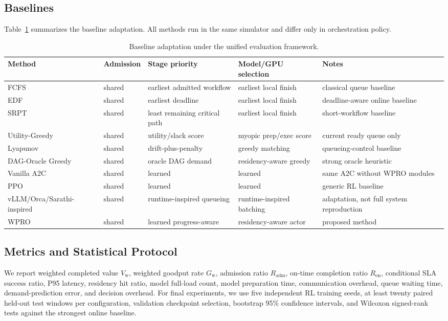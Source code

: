 \documentclass[10pt,conference]{IEEEtran}
\newcommand{\WPRO}{\textsc{WPRO}}
\begin{document}
\subsection{Baselines}

Table~\ref{tab:baselines} summarizes the baseline adaptation. All methods run in the same simulator and differ only in orchestration policy.

\begin{table}[t]
\centering
\caption{Baseline adaptation under the unified evaluation framework.}
\label{tab:baselines}
\begin{tabular}{lllll}
\toprule
Method & Admission & Stage priority & Model/GPU selection & Notes \\
\midrule
FCFS & shared & earliest admitted workflow & earliest local finish & classical queue baseline \\
EDF & shared & earliest deadline & earliest local finish & deadline-aware online baseline \\
SRPT & shared & least remaining critical path & earliest local finish & short-workflow baseline \\
Utility-Greedy & shared & utility/slack score & myopic prep/exec score & current ready queue only \\
Lyapunov & shared & drift-plus-penalty & greedy matching & queueing-control baseline \\
DAG-Oracle Greedy & shared & oracle DAG demand & residency-aware greedy & strong oracle heuristic \\
Vanilla A2C & shared & learned & learned & same A2C without WPRO modules \\
PPO & shared & learned & learned & generic RL baseline \\
vLLM/Orca/Sarathi-inspired & shared & runtime-inspired queueing & runtime-inspired batching & adaptation, not full system reproduction \\
\WPRO & shared & learned progress-aware & residency-aware actor & proposed method \\
\bottomrule
\end{tabular}
\end{table}

\subsection{Metrics and Statistical Protocol}

We report weighted completed value \(V_{\mathrm{w}}\), weighted goodput rate \(G_{\mathrm{w}}\), admission ratio \(R_{\mathrm{adm}}\), on-time completion ratio \(R_{\mathrm{on}}\), conditional SLA success ratio, P95 latency, residency hit ratio, model full-load count, model preparation time, communication overhead, queue waiting time, demand-prediction error, and decision overhead. For final experiments, we use five independent RL training seeds, at least twenty paired held-out test windows per configuration, validation checkpoint selection, bootstrap 95\% confidence intervals, and Wilcoxon signed-rank tests against the strongest online baseline.
\end{document}

